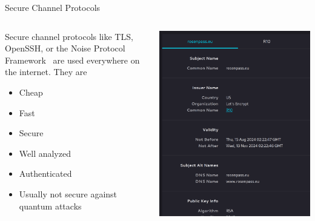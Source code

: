 
\begin{frame}{Secure Channel Protocols}
  \begin{columns}[T,onlytextwidth]
    \begin{column}{.4\linewidth}
      \small

      Secure channel protocols like TLS, OpenSSH, or the Noise Protocol Framework \citeNoise~are used everywhere on the internet. They are

      \begin{itemize}
        \item Cheap
        \item Fast
        \item Secure
        \item Well analyzed
        \item Authenticated
        \item Usually not secure against quantum attacks
      \end{itemize}
    \end{column}
    \begin{column}{.55\linewidth}
    \raggedleft
    \includegraphics[height=\defaultframetextheight]{graphics/2024-09-13-rosenpass-tls-cert.png}
    \end{column}
  \end{columns}
\end{frame}

